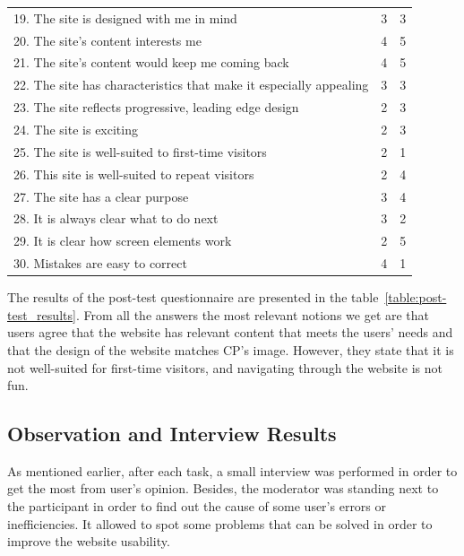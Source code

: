\documentclass[a4paper]{article}
\begin{document}
\begin{table}[H]
\begin{center}
\begin{tabular}{p{30em}| c | c }
19. The site is designed with me in mind                       &  3  &  3   \\
\rowcolor{green!20}
20. The site’s content interests me                            &  4  &  5  \\
\rowcolor{green!20}
21. The site’s content would keep me coming back               &  4  &  5   \\
22. The site has characteristics that make it especially appealing  &  3  & 3   \\
23. The site reflects progressive, leading edge design         &  2  &  3   \\
24. The site is exciting                                       &  2  &  3   \\
\rowcolor{red!20}
25. The site is well-suited to first-time visitors             &  2  &  1  \\
26. This site is well-suited to repeat visitors                 &  2  &  4  \\
27. The site has a clear purpose                               &  3  &  4   \\
28. It is always clear what to do next                         &  3  &  2  \\
29. It is clear how screen elements work                       &  2  &  5  \\
30. Mistakes are easy to correct                               &  4  &  1  \\
\hline
\end{tabular}
\end{center}
\end{table}

The results of the post-test questionnaire are presented in the table~\ref{table:post-test_results}. From all the answers the most relevant notions we get are that users agree that the website has relevant content that meets the users' needs and that the design of the website matches CP's image. However, they state that it is not well-suited for first-time visitors, and navigating through the website is not fun.


\subsection{Observation and Interview Results}

As mentioned earlier, after each task, a small interview was performed in order to get the most from user's opinion.
Besides, the moderator was standing next to the participant in order to find out the cause of some user's errors or inefficiencies. 
It allowed to spot some problems that can be solved in order to improve the website usability.
\end{document}
